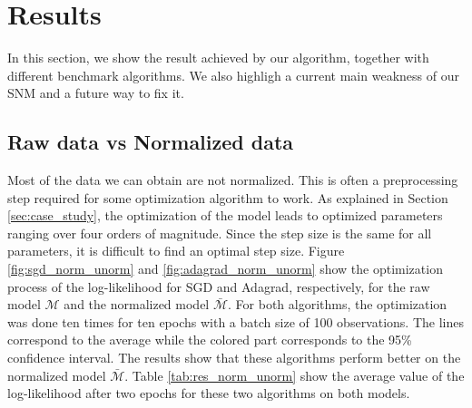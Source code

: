 \documentclass[conference]{IEEEtran}
\begin{document}
\section{Results}
\label{sec:res}

In this section, we show the result achieved by our algorithm, together with different benchmark algorithms. We also highligh a current main weakness of our SNM and a future way to fix it.

\subsection{Raw data vs Normalized data}
\label{sec:norm_unorm}

Most of the data we can obtain are not normalized. This is often a preprocessing step required for some optimization algorithm to work. As explained in Section \ref{sec:case_study}, the optimization of the model leads to optimized parameters ranging over four orders of magnitude. Since the step size is the same for all parameters, it is difficult to find an optimal step size. Figure \ref{fig:sgd_norm_unorm} and \ref{fig:adagrad_norm_unorm} show the optimization process of the log-likelihood for SGD and Adagrad, respectively, for the raw model $\mathcal{M}$ and the normalized model $\bar{\mathcal{M}}$. For both algorithms, the optimization was done ten times for ten epochs with a batch size of 100 observations. The lines correspond to the average while the colored part corresponds to the 95\% confidence interval. The results show that these algorithms perform better on the normalized model $\bar{\mathcal{M}}$. Table \ref{tab:res_norm_unorm} show the average value of the log-likelihood after two epochs for these two algorithms on both models.
\end{document}
